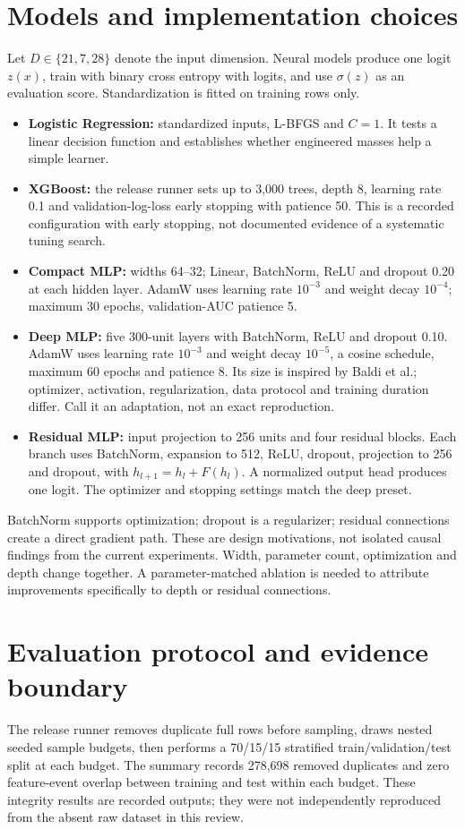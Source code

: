 \documentclass[11pt,a4paper]{article}
\begin{document}
\section{Models and implementation choices}
Let $D\in\{21,7,28\}$ denote the input dimension. Neural models produce one logit $z(x)$, train with binary cross entropy with logits, and use $\sigma(z)$ as an evaluation score. Standardization is fitted on training rows only.
\begin{itemize}
\item \textbf{Logistic Regression:} standardized inputs, L-BFGS and $C=1$. It tests a linear decision function and establishes whether engineered masses help a simple learner.
\item \textbf{XGBoost:} the release runner sets up to 3,000 trees, depth 8, learning rate 0.1 and validation-log-loss early stopping with patience 50. This is a recorded configuration with early stopping, not documented evidence of a systematic tuning search.
\item \textbf{Compact MLP:} widths 64--32; Linear, BatchNorm, ReLU and dropout 0.20 at each hidden layer. AdamW uses learning rate $10^{-3}$ and weight decay $10^{-4}$; maximum 30 epochs, validation-AUC patience 5.
\item \textbf{Deep MLP:} five 300-unit layers with BatchNorm, ReLU and dropout 0.10. AdamW uses learning rate $10^{-3}$ and weight decay $10^{-5}$, a cosine schedule, maximum 60 epochs and patience 8. Its size is inspired by Baldi et al.; optimizer, activation, regularization, data protocol and training duration differ. Call it an adaptation, not an exact reproduction.
\item \textbf{Residual MLP:} input projection to 256 units and four residual blocks. Each branch uses BatchNorm, expansion to 512, ReLU, dropout, projection to 256 and dropout, with $h_{l+1}=h_l+F(h_l)$. A normalized output head produces one logit. The optimizer and stopping settings match the deep preset.
\end{itemize}
BatchNorm supports optimization; dropout is a regularizer; residual connections create a direct gradient path. These are design motivations, not isolated causal findings from the current experiments. Width, parameter count, optimization and depth change together. A parameter-matched ablation is needed to attribute improvements specifically to depth or residual connections.

\section{Evaluation protocol and evidence boundary}
The release runner removes duplicate full rows before sampling, draws nested seeded sample budgets, then performs a 70/15/15 stratified train/validation/test split at each budget. The summary records 278,698 removed duplicates and zero feature-event overlap between training and test within each budget. These integrity results are recorded outputs; they were not independently reproduced from the absent raw dataset in this review.
\end{document}
